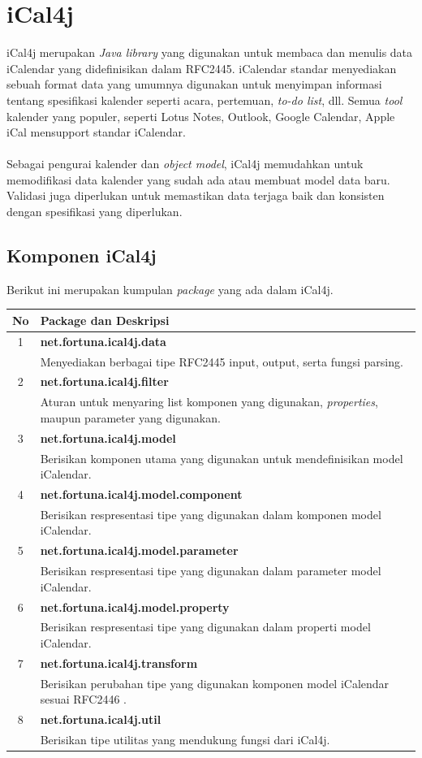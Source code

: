 \section{iCal4j}
iCal4j merupakan \textit{Java library} yang digunakan untuk membaca dan menulis data iCalendar yang didefinisikan dalam RFC2445. iCalendar standar menyediakan sebuah format data yang umumnya digunakan untuk menyimpan informasi tentang spesifikasi kalender seperti acara, pertemuan, \textit{to-do list}, dll. Semua \textit{tool} kalender yang populer, seperti Lotus Notes, Outlook, Google Calendar, Apple iCal mensupport standar iCalendar.\cite{ical2}
\\ \\
Sebagai pengurai kalender dan \textit{object model}, iCal4j memudahkan untuk memodifikasi data kalender yang sudah ada atau membuat model data baru. Validasi juga diperlukan untuk memastikan data terjaga baik dan konsisten dengan spesifikasi yang diperlukan.\cite{ical2}


\subsection{Komponen iCal4j}
Berikut ini merupakan kumpulan \textit{package} yang ada dalam iCal4j.\cite{ical}\\
\begin{tabular}{|c|p{12cm}|}
		\hline
		\textbf{No} & \textbf{Package dan Deskripsi} \\ \hline \hline
		1 & \textbf{net.fortuna.ical4j.data}\\
			&	Menyediakan berbagai tipe RFC2445 input, output, serta fungsi parsing.\\ \hline
		2 & \textbf{net.fortuna.ical4j.filter}\\
			&	Aturan untuk menyaring list komponen yang digunakan, \textit{properties}, maupun parameter yang digunakan.\\ \hline
		3 & \textbf{net.fortuna.ical4j.model}\\
			&	Berisikan komponen utama yang digunakan untuk mendefinisikan model iCalendar.\\ \hline
		4 & \textbf{net.fortuna.ical4j.model.component	
}\\
			&	Berisikan respresentasi tipe yang digunakan dalam komponen model iCalendar.\\ \hline
		5 & \textbf{net.fortuna.ical4j.model.parameter}\\
			&	Berisikan respresentasi tipe yang digunakan dalam parameter model iCalendar.\\ \hline
		6 & \textbf{net.fortuna.ical4j.model.property}\\
			&	Berisikan respresentasi tipe yang digunakan dalam properti model iCalendar.\\ \hline
		7 & \textbf{net.fortuna.ical4j.transform}\\
			&	Berisikan perubahan tipe yang digunakan komponen model iCalendar sesuai RFC2446   .\\ \hline
		8 & \textbf{net.fortuna.ical4j.util}\\
			&	Berisikan tipe utilitas yang mendukung fungsi dari iCal4j.\\ \hline							
	\end{tabular}

